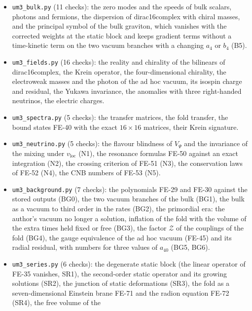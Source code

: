 \documentclass[
  10pt,
]{article}
\begin{document}
\begin{itemize}
  sources FE-30 to FE-33 (also by smoothing the kink), the conservation
  law FE-11 at the fold, the Friedmann equations of the frozen branch
  and the extra-time pressure it requires.
\item
  \texttt{um3\_bulk.py} (11 checks): the zero modes and the speeds of
  bulk scalars, photons and fermions, the dispersion of dirac16complex
  with chiral masses, and the principal symbol of the bulk graviton,
  which vanishes with the corrected weights at the static block and
  keeps gradient terms without a time-kinetic term on the two vacuum
  branches with a changing \(a_4\) or \(b_4\) (B5).
\item
  \texttt{um3\_fields.py} (16 checks): the reality and chirality of the
  bilinears of dirac16complex, the Krein operator, the four-dimensional
  chirality, the electroweak masses and the photon of the ad hoc vacuum,
  its isospin charge and residual, the Yukawa invariance, the anomalies
  with three right-handed neutrinos, the electric charges.
\item
  \texttt{um3\_spectra.py} (5 checks): the transfer matrices, the fold
  transfer, the bound states FE-40 with the exact \(16 \times 16\)
  matrices, their Krein signature.
\item
  \texttt{um3\_neutrino.py} (5 checks): the flavour blindness of
  \(V_\Psi\) and the invariance of the mixing under \(v_{\mathrm{loc}}\)
  (N1), the resonance formulas FE-50 against an exact integration (N2),
  the crossing criterion of FE-51 (N3), the conservation laws of FE-52
  (N4), the CNB numbers of FE-53 (N5).
\item
  \texttt{um3\_background.py} (7 checks): the polynomials FE-29 and
  FE-30 against the stored outputs (BG0), the two vacuum branches of the
  bulk (BG1), the bulk as a vacuum to third order in the rates (BG2),
  the primordial era: the author's vacuum no longer a solution,
  inflation of the fold with the volume of the extra times held fixed or
  free (BG3), the factor \(\mathcal{Z}\) of the couplings of the fold
  (BG4), the gauge equivalence of the ad hoc vacuum (FE-45) and its
  radial residual, with numbers for three values of \(a_{40}\) (BG5,
  BG6).
\item
  \texttt{um3\_series.py} (6 checks): the degenerate static block (the
  linear operator of FE-35 vanishes, SR1), the second-order static
  operator and its growing solutions (SR2), the junction of static
  deformations (SR3), the fold as a seven-dimensional Einstein brane
  FE-71 and the radion equation FE-72 (SR4), the free volume of the

\end{itemize}
\end{document}

